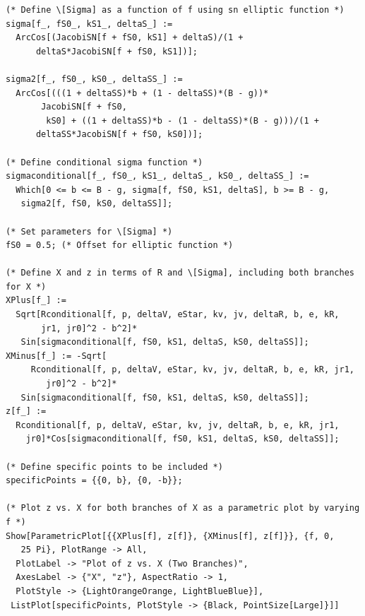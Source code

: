\documentclass[12pt,oneside]{report}
\theoremstyle{definition}
\begin{document}
\begin{verbatim}
(* Define \[Sigma] as a function of f using sn elliptic function *)
sigma[f_, fS0_, kS1_, deltaS_] := 
  ArcCos[(JacobiSN[f + fS0, kS1] + deltaS)/(1 + 
      deltaS*JacobiSN[f + fS0, kS1])];

sigma2[f_, fS0_, kS0_, deltaSS_] := 
  ArcCos[(((1 + deltaSS)*b + (1 - deltaSS)*(B - g))*
       JacobiSN[f + fS0, 
        kS0] + ((1 + deltaSS)*b - (1 - deltaSS)*(B - g)))/(1 + 
      deltaSS*JacobiSN[f + fS0, kS0])];

(* Define conditional sigma function *)
sigmaconditional[f_, fS0_, kS1_, deltaS_, kS0_, deltaSS_] := 
  Which[0 <= b <= B - g, sigma[f, fS0, kS1, deltaS], b >= B - g, 
   sigma2[f, fS0, kS0, deltaSS]];

(* Set parameters for \[Sigma] *)
fS0 = 0.5; (* Offset for elliptic function *)

(* Define X and z in terms of R and \[Sigma], including both branches for X *)
XPlus[f_] := 
  Sqrt[Rconditional[f, p, deltaV, eStar, kv, jv, deltaR, b, e, kR, 
       jr1, jr0]^2 - b^2]*
   Sin[sigmaconditional[f, fS0, kS1, deltaS, kS0, deltaSS]];
XMinus[f_] := -Sqrt[
     Rconditional[f, p, deltaV, eStar, kv, jv, deltaR, b, e, kR, jr1, 
        jr0]^2 - b^2]*
   Sin[sigmaconditional[f, fS0, kS1, deltaS, kS0, deltaSS]];
z[f_] := 
  Rconditional[f, p, deltaV, eStar, kv, jv, deltaR, b, e, kR, jr1, 
    jr0]*Cos[sigmaconditional[f, fS0, kS1, deltaS, kS0, deltaSS]];

(* Define specific points to be included *)
specificPoints = {{0, b}, {0, -b}};

(* Plot z vs. X for both branches of X as a parametric plot by varying f *)
Show[ParametricPlot[{{XPlus[f], z[f]}, {XMinus[f], z[f]}}, {f, 0, 
   25 Pi}, PlotRange -> All, 
  PlotLabel -> "Plot of z vs. X (Two Branches)", 
  AxesLabel -> {"X", "z"}, AspectRatio -> 1, 
  PlotStyle -> {LightOrangeOrange, LightBlueBlue}], 
 ListPlot[specificPoints, PlotStyle -> {Black, PointSize[Large]}]]
\end{verbatim}
\end{document}

